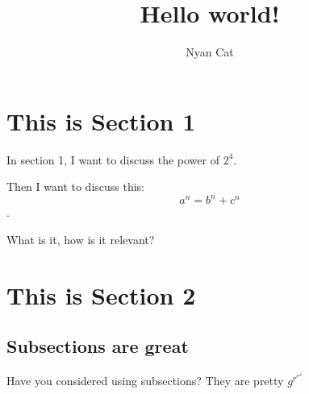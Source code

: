 \documentclass[10pt, oneside]{article}
\title{Hello world!}
\author{Nyan Cat}
\begin{document}
\section{This is Section 1}

In section 1, I want to discuss the power of $2^4$.

Then I want to discuss this:
$$ a^n = b^n + c^n $$.

What is it, how is it relevant?

\section{This is Section 2}
\subsection{Subsections are great}

Have you considered using subsections? They are pretty $g^{r^{e^{a^{t}}}}$
\end{document}
